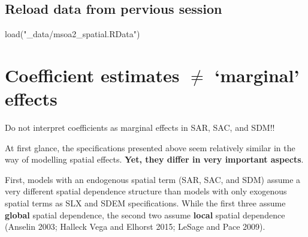 \documentclass[
  letterpaper,
  DIV=11,
  numbers=noendperiod]{scrreprt}
\newenvironment{Shaded}{\begin{snugshade}}{\end{snugshade}}
\newcommand{\FunctionTok}[1]{\textcolor[rgb]{0.28,0.35,0.67}{#1}}
\newcommand{\NormalTok}[1]{\textcolor[rgb]{0.00,0.23,0.31}{#1}}
\newcommand{\StringTok}[1]{\textcolor[rgb]{0.13,0.47,0.30}{#1}}
\begin{document}
\hypertarget{reload-data-from-pervious-session-7}{%
\subsection*{Reload data from pervious
session}\label{reload-data-from-pervious-session-7}}

\begin{Shaded}
\begin{Highlighting}[]
\FunctionTok{load}\NormalTok{(}\StringTok{"\_data/msoa2\_spatial.RData"}\NormalTok{)}
\end{Highlighting}
\end{Shaded}

\hypertarget{coefficient-estimates-neq-marginal-effects}{%
\section{\texorpdfstring{Coefficient estimates \(\neq\) `marginal'
effects}{Coefficient estimates \textbackslash neq `marginal' effects}}\label{coefficient-estimates-neq-marginal-effects}}

\begin{tcolorbox}[enhanced jigsaw, opacitybacktitle=0.6, left=2mm, leftrule=.75mm, toptitle=1mm, breakable, colback=white, bottomrule=.15mm, colframe=quarto-callout-warning-color-frame, colbacktitle=quarto-callout-warning-color!10!white, coltitle=black, bottomtitle=1mm, titlerule=0mm, title=\textcolor{quarto-callout-warning-color}{\faExclamationTriangle}\hspace{0.5em}{Warning}, opacityback=0, arc=.35mm, rightrule=.15mm, toprule=.15mm]

Do not interpret coefficients as marginal effects in SAR, SAC, and SDM!!

\end{tcolorbox}

At first glance, the specifications presented above seem relatively
similar in the way of modelling spatial effects. \textbf{Yet, they
differ in very important aspects}.

First, models with an endogenous spatial term (SAR, SAC, and SDM) assume
a very different spatial dependence structure than models with only
exogenous spatial terms as SLX and SDEM specifications. While the first
three assume \textbf{global} spatial dependence, the second two assume
\textbf{local} spatial dependence (Anselin 2003; Halleck Vega and
Elhorst 2015; LeSage and Pace 2009).
\end{document}

